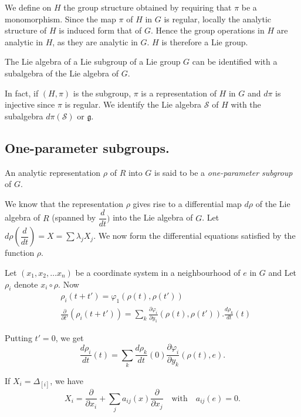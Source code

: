 We define on $H$ the group structure obtained by requiring that $\pi$
be a monomorphism. Since the map $\pi$ of $H$ in $G$ is regular,
locally the analytic structure of $H$ is induced form that of
$G$. Hence the group operations in $H$ are analytic in $H$, as they
are analytic in $G$. $H$ is therefore a Lie group. 

\begin{proposition}\label{chap3-prop4}%
 The Lie algebra of a Lie subgroup of a Lie group $G$ can be
 identified with a subalgebra of the Lie algebra of $G$. 
\end{proposition}

In fact, if $(H, \pi)$ is the subgroup, $\pi$ is a representation of
$H$ in $G$ and $d\pi$ is injective since $\pi$ is regular. We identify
the Lie algebra $\mathscr{S}$ of $H$ with the subalgebra
$d\pi\mathscr{(S)}$ or $\mathfrak{g}$. 

\subsection{One-parameter subgroups.}\label{chap3-sec3.3}%

\begin{defi*}%
An analytic representation $\rho$ of $R$ into $G$ is said to be a {\em
  one-parameter subgroup} of $G$. 
\end{defi*}

We know that the representation $\rho$ gives rise to a differential
map $d \rho$ of the Lie algebra of $R$ (spanned by $\dfrac{d}{dt})$
into the Lie algebra of $G$. Let $d \rho (\dfrac{d}{dt})=X=\sum
\lambda_j X_j$. We now form the differential equations satisfied by
the function $\rho$. 

Let $(x_1, x_2, \ldots x_n)$ be a coordinate system in a neighbourhood
of $e$ in $G$ and Let $\rho_i$ denote $x_i\circ \rho$. Now 
\begin{align*}
& \rho_i (t+ t')  = \varphi_1(\rho (t), \rho(t'))\\
& \frac{\partial}{\partial t'}(\rho_i(t+t'))  = \sum_{k}
\frac{\partial \varphi_i}{\partial y_1} (\rho (t), \rho(t')).\frac{d
  \rho_k}{dt}(t) 
\end{align*}

Putting $t'=0$, we get
$$ 
\frac{d \rho_i}{dt}(t) = \sum_{k} \frac{d \rho_k}{dt}(0)
\frac{\partial \varphi_i}{ \partial y_k}(\rho (t), e). 
$$\pageoriginale

If  $X_i=\Delta_{[i]}$, we have
$$
X_i = \frac{\partial}{\partial x_i} + \sum_{j}  a_{ij}(x)
\frac{\partial}{\partial x_j}\quad \text{with}\quad a_{ij}(e)=0. 
 $$

